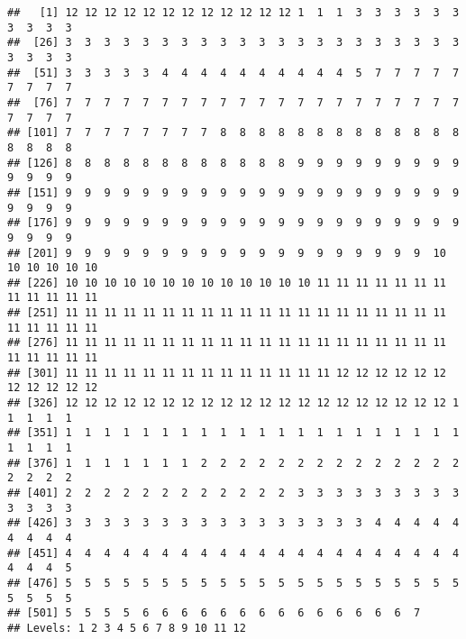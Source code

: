 \documentclass[
]{article}
\newenvironment{Shaded}{\begin{snugshade}}{\end{snugshade}}
\newcommand{\FunctionTok}[1]{\textcolor[rgb]{0.13,0.29,0.53}{\textbf{#1}}}
\newcommand{\NormalTok}[1]{#1}
\newcommand{\OtherTok}[1]{\textcolor[rgb]{0.56,0.35,0.01}{#1}}
\newcommand{\SpecialCharTok}[1]{\textcolor[rgb]{0.81,0.36,0.00}{\textbf{#1}}}
\begin{document}
\begin{Shaded}
\end{Shaded}

\begin{verbatim}
##   [1] 12 12 12 12 12 12 12 12 12 12 12 12 1  1  1  3  3  3  3  3  3  3  3  3  3 
##  [26] 3  3  3  3  3  3  3  3  3  3  3  3  3  3  3  3  3  3  3  3  3  3  3  3  3 
##  [51] 3  3  3  3  3  4  4  4  4  4  4  4  4  4  4  5  7  7  7  7  7  7  7  7  7 
##  [76] 7  7  7  7  7  7  7  7  7  7  7  7  7  7  7  7  7  7  7  7  7  7  7  7  7 
## [101] 7  7  7  7  7  7  7  7  8  8  8  8  8  8  8  8  8  8  8  8  8  8  8  8  8 
## [126] 8  8  8  8  8  8  8  8  8  8  8  8  9  9  9  9  9  9  9  9  9  9  9  9  9 
## [151] 9  9  9  9  9  9  9  9  9  9  9  9  9  9  9  9  9  9  9  9  9  9  9  9  9 
## [176] 9  9  9  9  9  9  9  9  9  9  9  9  9  9  9  9  9  9  9  9  9  9  9  9  9 
## [201] 9  9  9  9  9  9  9  9  9  9  9  9  9  9  9  9  9  9  9  10 10 10 10 10 10
## [226] 10 10 10 10 10 10 10 10 10 10 10 10 10 11 11 11 11 11 11 11 11 11 11 11 11
## [251] 11 11 11 11 11 11 11 11 11 11 11 11 11 11 11 11 11 11 11 11 11 11 11 11 11
## [276] 11 11 11 11 11 11 11 11 11 11 11 11 11 11 11 11 11 11 11 11 11 11 11 11 11
## [301] 11 11 11 11 11 11 11 11 11 11 11 11 11 11 12 12 12 12 12 12 12 12 12 12 12
## [326] 12 12 12 12 12 12 12 12 12 12 12 12 12 12 12 12 12 12 12 12 1  1  1  1  1 
## [351] 1  1  1  1  1  1  1  1  1  1  1  1  1  1  1  1  1  1  1  1  1  1  1  1  1 
## [376] 1  1  1  1  1  1  1  2  2  2  2  2  2  2  2  2  2  2  2  2  2  2  2  2  2 
## [401] 2  2  2  2  2  2  2  2  2  2  2  2  3  3  3  3  3  3  3  3  3  3  3  3  3 
## [426] 3  3  3  3  3  3  3  3  3  3  3  3  3  3  3  3  4  4  4  4  4  4  4  4  4 
## [451] 4  4  4  4  4  4  4  4  4  4  4  4  4  4  4  4  4  4  4  4  4  4  4  4  5 
## [476] 5  5  5  5  5  5  5  5  5  5  5  5  5  5  5  5  5  5  5  5  5  5  5  5  5 
## [501] 5  5  5  5  6  6  6  6  6  6  6  6  6  6  6  6  6  6  7 
## Levels: 1 2 3 4 5 6 7 8 9 10 11 12
\end{verbatim}

\begin{Shaded}
\end{Shaded}
\end{document}
